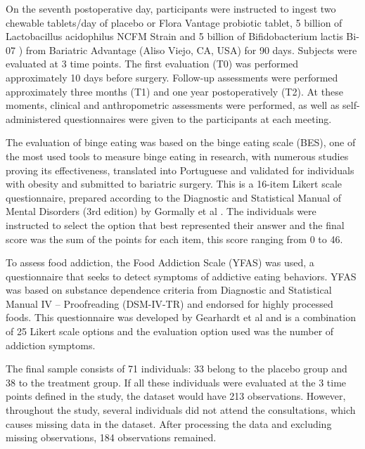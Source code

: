 \documentclass[AMA,STIX1COL]{WileyNJD-v2}
\begin{document}
On the seventh postoperative day, participants were instructed to ingest two chewable tablets/day of placebo or Flora Vantage probiotic tablet, 5 billion of Lactobacillus acidophilus NCFM \textregistered Strain and 5 billion of Bifidobacterium lactis Bi-07 \textregistered) from Bariatric Advantage (Aliso Viejo, CA, USA) for 90 days. Subjects were evaluated at 3 time points. The first evaluation (T0) was performed approximately 10 days before surgery. Follow-up assessments were performed approximately three months (T1) and one year postoperatively (T2). At these moments, clinical and anthropometric assessments were performed, as well as self-administered questionnaires were given to the participants at each meeting.

The evaluation of binge eating was based on the binge eating scale (BES), one of the most used tools to measure binge eating in research, with numerous studies proving its effectiveness, translated into Portuguese and validated for individuals with obesity and submitted to bariatric surgery. This is a 16-item Likert scale questionnaire, prepared according to the Diagnostic and Statistical Manual of Mental Disorders (3rd edition) \cite{spitzer1980diagnostic} by Gormally et al \cite{gormally1982assessment}. The individuals were instructed to select the option that best represented their answer and the final score was the sum of the points for each item, this score ranging from 0 to 46.

To assess food addiction, the Food Addiction Scale (YFAS) was used, a questionnaire that seeks to detect symptoms of addictive eating behaviors. YFAS was based on substance dependence criteria from Diagnostic and Statistical Manual IV – Proofreading (DSM-IV-TR) \cite{segal2010diagnostic} and endorsed for highly processed foods. This questionnaire was developed by Gearhardt et al \cite{gearhardt2009preliminary} and is a combination of 25 Likert scale options and the evaluation option used was the number of addiction symptoms.


The final sample consists of 71 individuals: 33 belong to the placebo group and 38 to the treatment group. If all these individuals were evaluated at the 3 time points defined in the study, the dataset would have 213 observations. However, throughout the study, several individuals did not attend the consultations, which causes missing data in the dataset. After processing the data and excluding missing observations, 184 observations remained.
\end{document}
